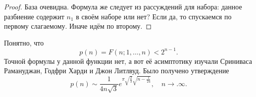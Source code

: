 \begin{proof}
	База очевидна. Формула же следует из рассуждений для набора: данное разбиение содержит $n_1$ в своём наборе или нет? Если да, то спускаемся по первому слагаемому. Иначе идём по второму.
\end{proof}

\begin{note}
	Понятно, что
	\[
		p(n) = F(n; 1, \ldots, n) < 2^{n - 1}.
	\]
	Точной формулы у данной функции нет, а вот её асимптотику изучали Сриниваса Рамануджан, Годфри Харди и Джон Литлвуд. Было получено утверждение
	\[
		p(n) \sim \frac{1}{4n\sqrt{3}} e^{\pi\sqrt{\frac{2}{3}}\sqrt{n - \frac{1}{24}}},\quad n \to. \infty.
	\]
\end{note}